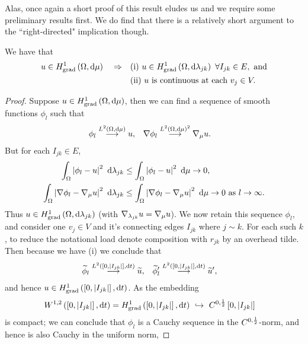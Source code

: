 Alas, once again a short proof of this result eludes us and we require some preliminary results first.
We do find that there is a relatively short argument to the ``right-directed" implication though.
\begin{prop} \label{prop:CharGradSobRightImplies}
	We have that
	\begin{align*}
		u\in\gradSob{\ddom}{\ddmes} \quad \Rightarrow 
		&\quad\text{(i)} \ u\in\gradSob{\ddom}{\lambda_{jk}} \ \forall I_{jk}\in E, \text{ and}\\
		&\quad\text{(ii)} \ u \text{ is continuous at each } v_j\in V.
	\end{align*}
\end{prop}
\begin{proof}
	Suppose $u\in H^1_\mathrm{grad}\left( \Omega, \mathrm{d}\mu \right)$, then we can find a sequence of smooth functions $\phi_l$ such that
	\begin{align*}
		\phi_l \overset{L^{2}\left( \Omega,\mathrm{d}\mu \right)}{\longrightarrow} u, 
		&\quad \nabla\phi_l \overset{L^{2}\left( \Omega,\mathrm{d}\mu \right)^2}{\longrightarrow} \nabla_\mu u.
	\end{align*}
	But for each $I_{jk}\in E$,
	\begin{align*}
		\int_{\Omega}\left\lvert  \phi_l - u  \right\rvert^2 \ \mathrm{d}\lambda_{jk}
		&\leq \int_{\Omega}\left\lvert  \phi_l - u  \right\rvert^2 \ \mathrm{d}\mu \rightarrow 0, \\
		\int_{\Omega}\left\lvert  \nabla\phi_l - \nabla_\mu u  \right\rvert^2 \ \mathrm{d}\lambda_{jk}
		&\leq \int_{\Omega}\left\lvert  \nabla\phi_l - \nabla_\mu u  \right\rvert^2 \ \mathrm{d}\mu \rightarrow 0 \ \text{as} \ l \rightarrow\infty.
	\end{align*}
	Thus $u\in H^1_\mathrm{grad}\left( \Omega, \mathrm{d}\lambda_{jk} \right)$ (with $\nabla_{\lambda_{jk}}u = \nabla_\mu u$).
	We now retain this sequence $\phi_l$, and consider one $v_j\in V$ and it's connecting edges $I_{jk}$ where $j\sim k$.
	For each such $k$, to reduce the notational load denote composition with $r_{jk}$ by an overhead tilde.
	Then because we have (i) we conclude that 
	\begin{align*}
		\widetilde{\phi}_l \overset{L^{2}\left( \left[ 0,\left\lvert I_{jk} \right\rvert \right],\mathrm{d}t \right)}{\longrightarrow} \widetilde{u}, 
		&\quad \widetilde{\phi}'_l \overset{L^{2}\left( \left[ 0,\left\lvert I_{jk} \right\rvert \right],\mathrm{d}t \right)}{\longrightarrow} \widetilde{u}',
	\end{align*}
	and hence $u\in H^1_\mathrm{grad}\left( \left[ 0,\left\lvert I_{jk} \right\rvert \right], \mathrm{d}t \right)$.
	As the embedding 
	\begin{align*}
		W^{1,2}\bracs{\interval{I_{jk}}, \md t} = \gradSob{\interval{I_{jk}}}{t} \ &\hookrightarrow \ C^{0,\recip{2}}\interval{I_{jk}}
	\end{align*}
	is compact; we can conclude that $\phi_l$ is a Cauchy sequence in the $C^{0,\frac{1}{2}}$-norm, and hence is also Cauchy in the uniform norm,

\end{proof}
